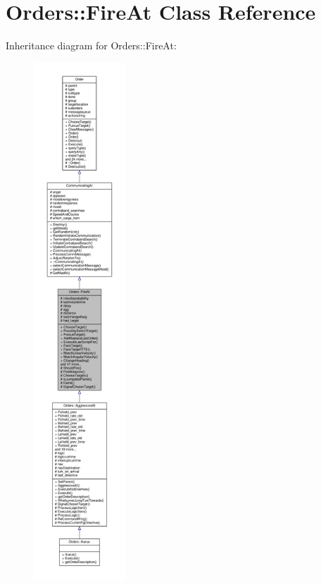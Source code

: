 \hypertarget{classOrders_1_1FireAt}{}\section{Orders\+:\+:Fire\+At Class Reference}
\label{classOrders_1_1FireAt}


Inheritance diagram for Orders\+:\+:Fire\+At\+:
\nopagebreak
\begin{figure}[H]
\begin{center}
\leavevmode
\includegraphics[height=550pt]{da/d67/classOrders_1_1FireAt__inherit__graph}
\end{center}
\end{figure}


